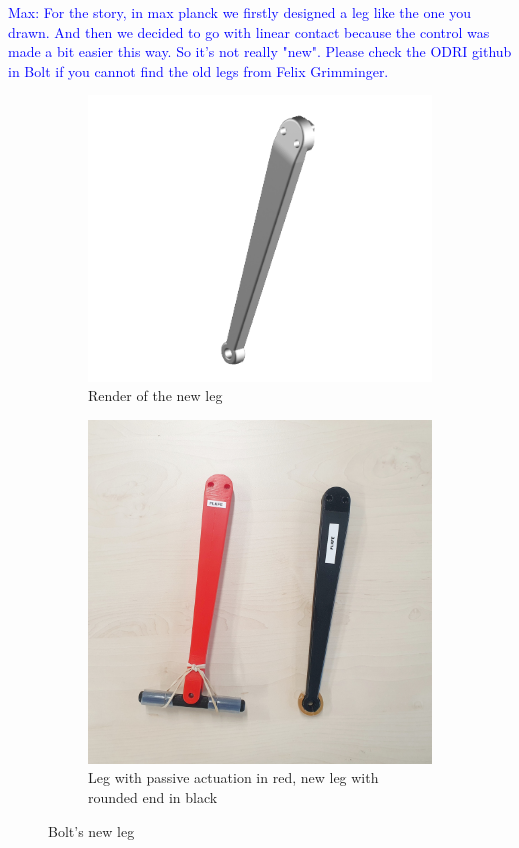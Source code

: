 \documentclass[a4paper,10pt]{article}
\newcommand{\mnaveau}[1]{\textcolor{blue}{Max: #1}}
\begin{document}
\mnaveau{For the story, in max planck we firstly designed a leg like the one you drawn. And then we decided to go with linear contact because the control was made a bit easier this way. So it's not really "new". Please check the ODRI github in Bolt if you cannot find the old legs from Felix Grimminger.}

\begin{figure}[H]
\centering

\begin{subfigure}{.5\textwidth}
\centering
  \includegraphics[width=1\linewidth, angle=0, scale=1.2]{./images/render_leg.png}
  \caption{Render of the new leg}
\end{subfigure}%
\begin{subfigure}{.5\textwidth}
\centering
  \includegraphics[width=\linewidth, angle=0, scale=0.9]{./images/Bolt_leg.jpg}
  \caption{Leg with passive actuation in red, new leg with rounded end in black}
\end{subfigure}
\caption{Bolt's new leg}
\label{Bolt new leg}
\end{figure}
\end{document}
